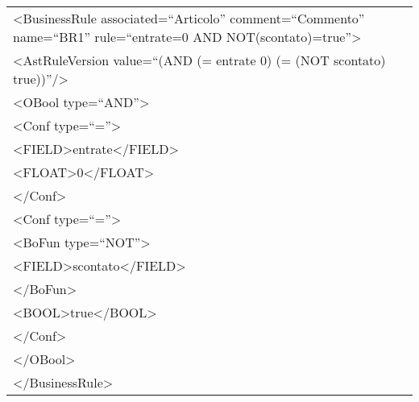 \begin{center}
\begin{tabular}{|p{11cm}|} \hline
\textless BusinessRule associated=``Articolo'' comment=``Commento'' name=``BR1'' rule=``entrate=0 AND NOT(scontato)=true''\textgreater \\
\textless AstRuleVersion value=``(AND (= entrate 0) (= (NOT scontato) true))''/\textgreater \\
 \textless OBool type=``AND''\textgreater \\
 \textless Conf type=``=''\textgreater \\
 \textless FIELD\textgreater entrate\textless /FIELD\textgreater \\
 \textless FLOAT\textgreater 0\textless /FLOAT\textgreater \\
 \textless /Conf\textgreater \\
 \textless Conf type=``=''\textgreater \\
\textless BoFun type=``NOT''\textgreater \\
 \textless FIELD\textgreater scontato\textless /FIELD\textgreater \\
\textless /BoFun\textgreater \\
 \textless BOOL\textgreater true\textless /BOOL\textgreater \\
\textless /Conf\textgreater \\
\textless /OBool\textgreater \\
\textless /BusinessRule\textgreater \\ \hline
\end{tabular} \\
\end{center}

